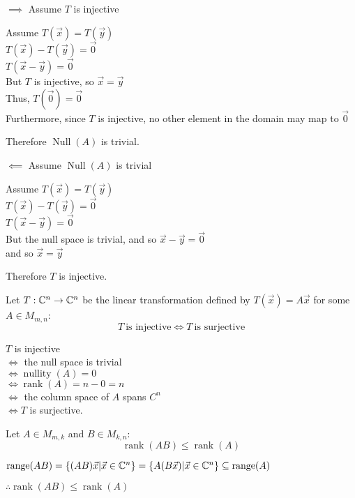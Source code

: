 \documentclass[letterpaper,12pt,fleqn]{article}
\newcommand{\vx}{\vec{x}}
\newcommand{\vy}{\vec{y}}
\newcommand{\vz}{\vec{0}}
\DeclareMathOperator{\Null}{Null}
\DeclareMathOperator{\nullity}{nullity}
\DeclareMathOperator{\range}{range}
\DeclareMathOperator{\rnk}{rank}
\begin{document}
\begin{theproof}
  \listbreak
  \begin{description}
  \item $\implies$ Assume $T$ is injective

    Assume $T(\vx)=T(\vy)$ \\
    $T(\vx)-T(\vy)=\vz$ \\
    $T(\vx-\vy)=\vz$ \\
    But $T$ is injective, so $\vx=\vy$ \\
    Thus, $T(\vz)=\vz$ \\
    Furthermore, since $T$ is injective, no other element in the domain may
    map to $\vz$

    Therefore $\Null(A)$ is trivial.

  \item $\impliedby$ Assume $\Null(A)$ is trivial

    Assume $T(\vx)=T(\vy)$ \\
    $T(\vx)-T(\vy)=\vz$ \\
    $T(\vx-\vy)=\vz$ \\
    But the null space is trivial, and so $\vx-\vy=\vz$ \\
    and so $\vx=\vy$

    Therefore $T$ is injective.
  \end{description}
\end{theproof}

\begin{theorem}
  Let $T:\mathbb{C}^n\to\mathbb{C}^n$ be the linear transformation defined by $T(\vx)=A\vx$ for
  some $A\in M_{m,n}$:
  \[T\ \mbox{is injective} \iff T\ \mbox{is surjective}\]
\end{theorem}

\begin{theproof}
  $T$ is injective \\
  $\iff$ the null space is trivial \\
  $\iff \nullity(A)=0$ \\
  $\iff \rnk(A)=n-0=n$ \\
  $\iff $ the column space of $A$ spans $C^n$ \\
  $\iff T$ is surjective.
\end{theproof}

\begin{lemma}
  Let $A\in M_{m,k}$ and $B\in M_{k,n}$:
  \[\rnk(AB)\le\rnk(A)\]
\end{lemma}

\begin{theproof}
  $\range(AB)=\{(AB)\vx|\vx\in\C^n\}=\{A(B\vx)|\vx\in\C^n\}\subseteq\range(A)$

  $\therefore \rnk(AB)\le\rnk(A)$
\end{theproof}
\end{document}
